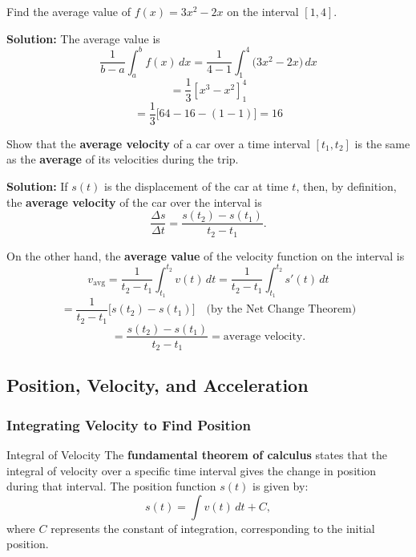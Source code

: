 \documentclass[12pt]{article}
\theoremstyle{beautifulthm}
\begin{document}
\begin{tcolorbox}[colback=examplebg, colframe=red!75!black, title=\textbf{EXAMPLE 1: Finding the Average Value of a Function}, fonttitle=\bfseries, sharp corners]
Find the average value of $f(x) = 3x^2 - 2x$ on the interval $[1, 4]$.


\tcblower
\textbf{Solution:} 
 The average value is
\[
\frac{1}{b - a} \int_a^b f(x) \, dx = \frac{1}{4 - 1} \int_1^4 \big(3x^2 - 2x\big) \, dx
\]
\[
= \frac{1}{3} \left[ x^3 - x^2 \right]_1^4
\]
\[
= \frac{1}{3} \big[ 64 - 16 - (1 - 1) \big]=16
\]

\end{tcolorbox}

\begin{tcolorbox}[colback=examplebg, colframe=red!75!black, title=\textbf{EXAMPLE 2: Average Velocity}, fonttitle=\bfseries, sharp corners]
Show that the \textbf{average velocity} of a car over a time interval $[t_1, t_2]$ is the same as the \textbf{average} of its velocities during the trip.



\tcblower
\textbf{Solution:} 
If $s(t)$ is the displacement of the car at time $t$, then, by definition, the \textbf{average velocity} of the car over the interval is
\[
\frac{\Delta s}{\Delta t} = \frac{s(t_2) - s(t_1)}{t_2 - t_1}.
\]

On the other hand, the \textbf{average value} of the velocity function on the interval is
\[
v_{\text{avg}} = \frac{1}{t_2 - t_1} \int_{t_1}^{t_2} v(t) \, dt = \frac{1}{t_2 - t_1} \int_{t_1}^{t_2} s'(t) \, dt
\]
\[
= \frac{1}{t_2 - t_1} \big[s(t_2) - s(t_1)\big] \quad \text{(by the Net Change Theorem)}
\]
\[
= \frac{s(t_2) - s(t_1)}{t_2 - t_1} = \text{average velocity}.
\]
\end{tcolorbox}


\subsection{Position,
Velocity, and Acceleration}


\subsubsection{Integrating Velocity to Find Position}

\begin{mytheorem}{Integral of Velocity}{}
    The \textbf{fundamental theorem of calculus} states that the integral of velocity over a specific time interval gives the change in position during that interval. The position function $s(t)$ is given by:
\[
s(t) = \int v(t) \, dt + C,
\]
where $C$ represents the constant of integration, corresponding to the initial position.
\end{mytheorem}
\end{document}
